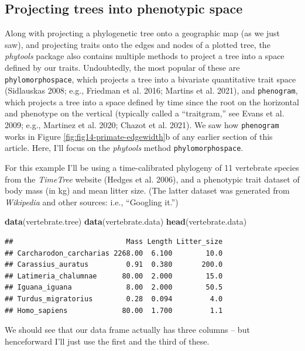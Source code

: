 \documentclass[fleqn,10pt,lineno]{wlpeerj} %
\newenvironment{Shaded}{\begin{snugshade}}{\end{snugshade}}
\newcommand{\FunctionTok}[1]{\textcolor[rgb]{0.13,0.29,0.53}{\textbf{#1}}}
\newcommand{\NormalTok}[1]{#1}
\begin{document}
\hypertarget{projecting-trees-into-phenotypic-space}{%
\subsection{Projecting trees into phenotypic space}\label{projecting-trees-into-phenotypic-space}}

Along with projecting a phylogenetic tree onto a geographic map (as we just saw), and projecting traits onto the edges and nodes of a plotted tree, the \emph{phytools} package also contains multiple methods to project a tree into a space defined by our traits. Undoubtedly, the most popular of these are \texttt{phylomorphospace}, which projects a tree into a bivariate quantitative trait space (Sidlauskas 2008; e.g., Friedman et al. 2016; Martins et al. 2021), and \texttt{phenogram}, which projects a tree into a space defined by time since the root on the horizontal and phenotype on the vertical (typically called a ``traitgram,'' see Evans et al. 2009; e.g., Martinez et al. 2020; Chazot et al. 2021). We saw how \texttt{phenogram} works in Figure \ref{fig:fig14-primate-edgewidth}b of any earlier section of this article. Here, I'll focus on the \emph{phytools} method \texttt{phylomorphospace}.

For this example I'll be using a time-calibrated phylogeny of 11 vertebrate species from the \emph{TimeTree} website (Hedges et al. 2006), and a phenotypic trait dataset of body mass (in kg) and mean litter size. (The latter dataset was generated from \emph{Wikipedia} and other sources: i.e., ``Googling it.'')

\begin{Shaded}
\begin{Highlighting}[]
\FunctionTok{data}\NormalTok{(vertebrate.tree)}
\FunctionTok{data}\NormalTok{(vertebrate.data)}
\FunctionTok{head}\NormalTok{(vertebrate.data)}
\end{Highlighting}
\end{Shaded}

\begin{verbatim}
##                           Mass Length Litter_size
## Carcharodon_carcharias 2268.00  6.100        10.0
## Carassius_auratus         0.91  0.380       200.0
## Latimeria_chalumnae      80.00  2.000        15.0
## Iguana_iguana             8.00  2.000        50.5
## Turdus_migratorius        0.28  0.094         4.0
## Homo_sapiens             80.00  1.700         1.1
\end{verbatim}

We should see that our data frame actually has three columns -- but henceforward I'll just use the first and the third of these.
\end{document}

